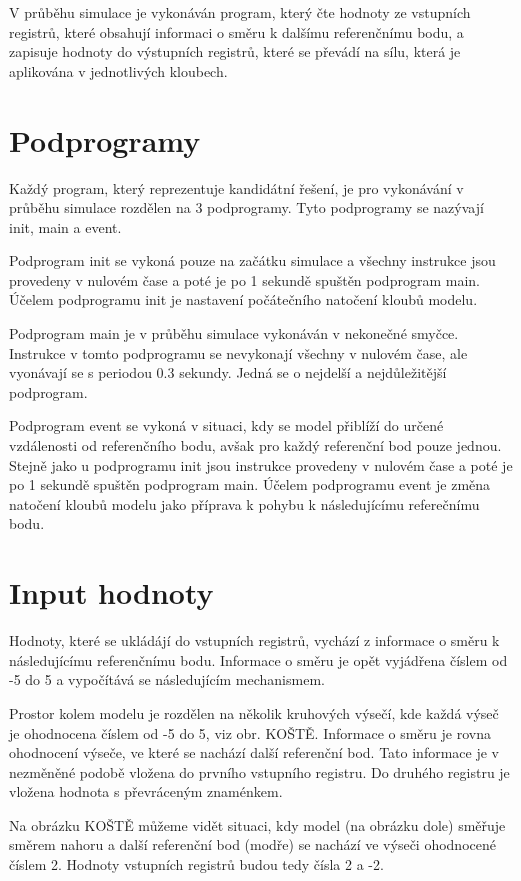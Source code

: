 V průběhu simulace je vykonáván program, který čte hodnoty ze vstupních registrů, které obsahují informaci o směru k dalšímu referenčnímu bodu, a zapisuje hodnoty do výstupních registrů, které se převádí na sílu, která je aplikována v jednotlivých kloubech.

\section{Podprogramy}

Každý program, který reprezentuje kandidátní řešení, je pro vykonávání v průběhu simulace rozdělen na 3 podprogramy.
Tyto podprogramy se nazývají init, main a event.

Podprogram init se vykoná pouze na začátku simulace a všechny instrukce jsou provedeny v nulovém čase a poté je po 1 sekundě spuštěn podprogram main.
Účelem podprogramu init je nastavení počátečního natočení kloubů modelu.

Podprogram main je v průběhu simulace vykonáván v nekonečné smyčce.
Instrukce v tomto podprogramu se nevykonají všechny v nulovém čase, ale vyonávají se s periodou 0.3 sekundy.
Jedná se o nejdelší a nejdůležitější podprogram.

Podprogram event se vykoná v situaci, kdy se model přiblíží do určené vzdálenosti od referenčního bodu, avšak pro každý referenční bod pouze jednou.
Stejně jako u podprogramu init jsou instrukce provedeny v nulovém čase a poté je po 1 sekundě spuštěn podprogram main.
Účelem podprogramu event je změna natočení kloubů modelu jako příprava k pohybu k následujícímu referečnímu bodu.

\section{Input hodnoty}

Hodnoty, které se ukládájí do vstupních registrů, vychází z informace o směru k následujícímu referenčnímu bodu.
Informace o směru je opět vyjádřena číslem od -5 do 5 a vypočítává se následujícím mechanismem.

Prostor kolem modelu je rozdělen na několik kruhových výsečí, kde každá výseč je ohodnocena číslem od -5 do 5, viz obr. KOŠTĚ.
Informace o směru je rovna ohodnocení výseče, ve které se nachází další referenční bod.
Tato informace je v nezměněné podobě vložena do prvního vstupního registru.
Do druhého registru je vložena hodnota s převráceným znaménkem.

Na obrázku KOŠTĚ můžeme vidět situaci, kdy model (na obrázku dole) směřuje směrem nahoru a další referenční bod (modře) se nachází ve výseči ohodnocené číslem 2.
Hodnoty vstupních registrů budou tedy čísla 2 a -2.

